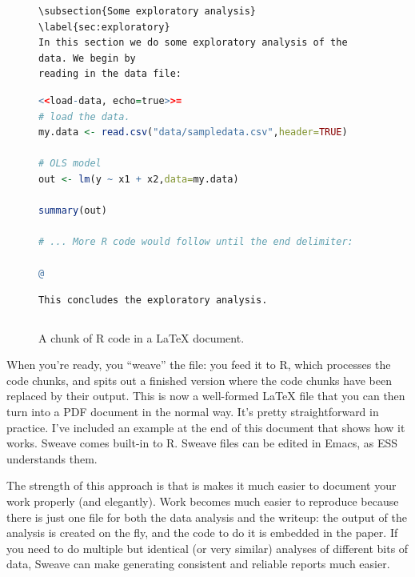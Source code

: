 \documentclass[11pt,article,oneside]{memoir}
\begin{document}
\begin{figure}
\begin{lstlisting}[style=sweave-top]

\end{lstlisting} 
\begin{lstlisting}[language={[latex]tex},numbers=none,style=sweave-tex]   
\subsection{Some exploratory analysis}
\label{sec:exploratory}
In this section we do some exploratory analysis of the data. We begin by
reading in the data file:
\end{lstlisting}
\begin{lstlisting}[language=R,numbers=none,style=sweave-r] 
<<load-data, echo=true>>=
# load the data. 
my.data <- read.csv("data/sampledata.csv",header=TRUE)

# OLS model
out <- lm(y ~ x1 + x2,data=my.data)

summary(out)

# ... More R code would follow until the end delimiter:

@ 
\end{lstlisting}
\begin{lstlisting}[language={[latex]tex},numbers=none,style=sweave-tex] 
% now we are back to normal latex 
This concludes the exploratory analysis. 
\end{lstlisting} 
\begin{lstlisting}[style=sweave-bottom]

\end{lstlisting}
  \caption{A chunk of R code in a LaTeX document.}
\label{fig:codechunk}
\end{figure}

When you're ready, you ``weave'' the file: you feed it to R, which processes the code chunks, and spits out a finished version where the code chunks have been replaced by their output. This is now a well-formed LaTeX file that you can then turn into a PDF document in the normal way. It's pretty straightforward in practice. I've included an example at the end of this document that shows how it works. Sweave comes built-in to R. Sweave files can be edited in Emacs, as ESS understands them. 

The strength of this approach is that is makes it much easier to document your work properly (and elegantly). Work becomes much easier to reproduce because there is just one file for both the data analysis and the writeup: the output of the analysis is created on the fly, and the code to do it is embedded in the paper. If you need to do multiple but identical (or very similar) analyses of different bits of data, Sweave can make generating consistent and reliable reports much easier.
\end{document}
